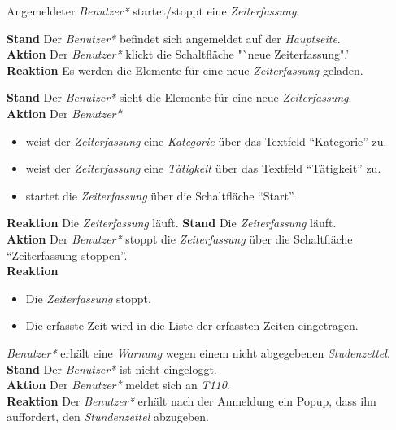 \begin{requirements}
\begin{requirements}
	\end{requirements}
	 Angemeldeter \emph{Benutzer*} startet/stoppt eine \emph{Zeiterfassung}.
	\begin{requirements}
            \textbf{Stand} Der \emph{Benutzer*} befindet sich angemeldet auf der \emph{Hauptseite}. \\
            \textbf{Aktion} Der \emph{Benutzer*} klickt die Schaltfläche "`neue Zeiterfassung".' \\
            \textbf{Reaktion} Es werden die Elemente für eine neue \emph{Zeiterfassung} geladen.
            \item
                \textbf{Stand} Der \emph{Benutzer*} sieht die Elemente für eine neue \emph{Zeiterfassung}. \\
                \textbf{Aktion} Der \emph{Benutzer*}
                    \begin{itemize}
                        \item weist der \emph{Zeiterfassung} eine \emph{Kategorie} über das Textfeld "`Kategorie"' zu.
                        \item weist der \emph{Zeiterfassung} eine \emph{Tätigkeit} über das Textfeld "`Tätigkeit"' zu.
                        \item startet die \emph{Zeiterfassung} über die Schaltfläche "`Start"'.
                    \end{itemize}
                \textbf{Reaktion} Die \emph{Zeiterfassung} läuft.
            \textbf{Stand} Die \emph{Zeiterfassung} läuft. \\
            \textbf{Aktion} Der \emph{Benutzer*} stoppt die \emph{Zeiterfassung} über die Schaltfläche "`Zeiterfassung stoppen"'. \\
            \textbf{Reaktion}
                \begin{itemize}
                    \item Die \emph{Zeiterfassung} stoppt.
                    \item Die erfasste Zeit wird in die Liste der erfassten Zeiten eingetragen.
                \end{itemize}
	\end{requirements}


	 \emph{Benutzer*} erhält eine \emph{Warnung} wegen einem nicht abgegebenen \emph{Studenzettel}. \\
        \textbf{Stand} Der \emph{Benutzer*} ist nicht eingeloggt. \\
        \textbf{Aktion} Der \emph{Benutzer*} meldet sich an \emph{T110}. \\
        \textbf{Reaktion} Der \emph{Benutzer*} erhält nach der Anmeldung ein Popup, dass ihn auffordert, den \emph{Stundenzettel} abzugeben.


\end{requirements}
